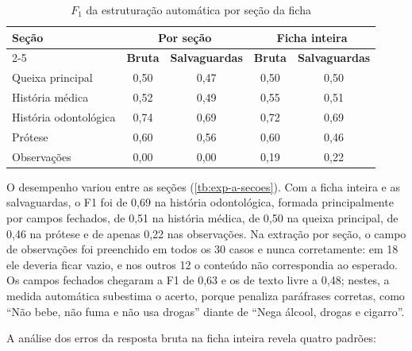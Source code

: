 \begin{table}[htbp]
	\caption{$F_1$ da estruturação automática por seção da ficha}
	\label{tb:exp-a-secoes}
	\footnotesize
	\centering
	\begin{tabular}{lcccc}
		\hline
		\multirow{2}{*}{\textbf{Seção}} & \multicolumn{2}{c}{\textbf{Por seção}} & \multicolumn{2}{c}{\textbf{Ficha inteira}} \\ \cline{2-5}
		& \textbf{Bruta} & \textbf{Salvaguardas} & \textbf{Bruta} & \textbf{Salvaguardas} \\ \hline
		Queixa principal & 0,50 & 0,47 & 0,50 & 0,50 \\
		História médica & 0,52 & 0,49 & 0,55 & 0,51 \\
		História odontológica & 0,74 & 0,69 & 0,72 & 0,69 \\
		Prótese & 0,60 & 0,56 & 0,60 & 0,46 \\
		Observações & 0,00 & 0,00 & 0,19 & 0,22 \\ \hline
	\end{tabular}
\end{table}

O desempenho variou entre as seções (\autoref{tb:exp-a-secoes}). Com a ficha inteira e as salvaguardas, o F1 foi de 0,69 na história odontológica, formada principalmente por campos fechados, de 0,51 na história médica, de 0,50 na queixa principal, de 0,46 na prótese e de apenas 0,22 nas observações. Na extração por seção, o campo de observações foi preenchido em todos os 30 casos e nunca corretamente: em 18 ele deveria ficar vazio, e nos outros 12 o conteúdo não correspondia ao esperado. Os campos fechados chegaram a F1 de 0,63 e os de texto livre a 0,48; nestes, a medida automática subestima o acerto, porque penaliza paráfrases corretas, como ``Não bebe, não fuma e não usa drogas'' diante de ``Nega álcool, drogas e cigarro''.

A análise dos erros da resposta bruta na ficha inteira revela quatro padrões:

